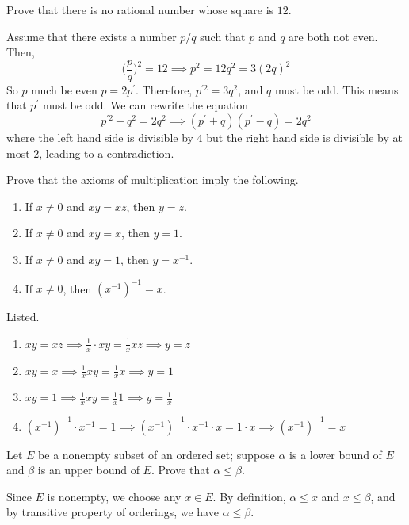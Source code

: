 \documentclass{article}
\begin{document}
    \begin{exercise}[Rudin 1.2]
    Prove that there is no rational number whose square is $12$. 
    \end{exercise}
    \begin{solution}
    Assume that there exists a number $p/q$ such that $p$ and $q$ are both not even. Then, 
    \[\bigg( \frac{p}{q} \bigg)^2 = 12 \implies p^2 = 12q^2 = 3 (2 q)^2\]
    So $p$ much be even $p = 2 p^\prime$. Therefore, $p^{\prime 2} = 3 q^2$, and $q$ must be odd. This means that $p^\prime$ must be odd. We can rewrite the equation 
    \[p^{\prime 2} - q^2 = 2 q^2 \implies (p^\prime + q) (p^\prime - q) = 2q^2\]
    where the left hand side is divisible by $4$ but the right hand side is divisible by at most $2$, leading to a contradiction. 
    \end{solution}

    \begin{exercise}[Rudin 1.3]
    Prove that the axioms of multiplication imply the following. 
    \begin{enumerate}
        \item If $x \neq 0$ and $xy = xz$, then $y = z$. 
        \item If $x \neq 0$ and $xy = x$, then $y = 1$. 
        \item If $x \neq 0$ and $xy = 1$, then $y = x^{-1}$. 
        \item If $x \neq 0$, then $(x^{-1})^{-1} = x$. 
    \end{enumerate}
    \end{exercise}
    \begin{solution}
    Listed. 
    \begin{enumerate}
        \item $xy = xz \implies \frac{1}{x} \cdot x y = \frac{1}{x} x z \implies y = z$ 
        \item $x y = x \implies \frac{1}{x} x y = \frac{1}{x} x \implies y = 1$ 
        \item $x y = 1 \implies \frac{1}{x} x y = \frac{1}{x} 1 \implies y = \frac{1}{x}$ 
        \item $(x^{-1})^{-1} \cdot x^{-1} = 1 \implies (x^{-1})^{-1} \cdot x^{-1} \cdot x = 1 \cdot x \implies (x^{-1})^{-1} = x$
    \end{enumerate}
    \end{solution}

    \begin{exercise}[Rudin 1.4]
    Let $E$ be a nonempty subset of an ordered set; suppose $\alpha$ is a lower bound of $E$ and $\beta$ is an upper bound of $E$. Prove that $\alpha \leq \beta$. 
    \end{exercise}
    \begin{solution}
    Since $E$ is nonempty, we choose any $x \in E$. By definition, $\alpha \leq x$ and $x \leq \beta$, and by transitive property of orderings, we have $\alpha \leq \beta$. 
    \end{solution}
\end{document}
